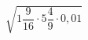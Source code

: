 \begin{ex}[type=calculate]
	\begin{condition}
		\( \sqrt{1\dfrac{9}{16}\cdot5\dfrac{4}{9}\cdot0,01} \)
	\end{condition}
\end{ex}